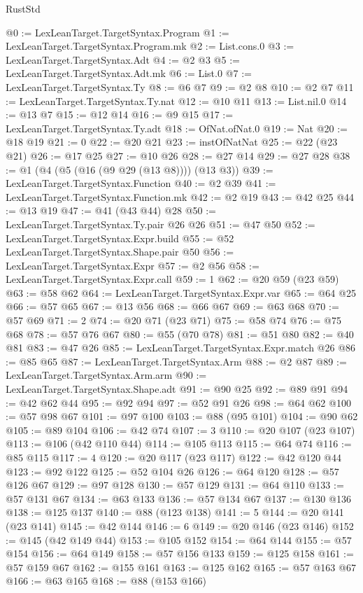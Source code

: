 \begin{lexlean}{RustStd}
\begin{coremodule}
@0 := LexLeanTarget.TargetSyntax.Program
@1 := LexLeanTarget.TargetSyntax.Program.mk
@2 := List.cons.{0}
@3 := LexLeanTarget.TargetSyntax.Adt
@4 := @2 @3
@5 := LexLeanTarget.TargetSyntax.Adt.mk
@6 := List.{0}
@7 := LexLeanTarget.TargetSyntax.Ty
@8 := @6 @7
@9 := @2 @8
@10 := @2 @7
@11 := LexLeanTarget.TargetSyntax.Ty.nat
@12 := @10 @11
@13 := List.nil.{0}
@14 := @13 @7
@15 := @12 @14
@16 := @9 @15
@17 := LexLeanTarget.TargetSyntax.Ty.adt
@18 := OfNat.ofNat.{0}
@19 := Nat
@20 := @18 @19
@21 := 0
@22 := @20 @21
@23 := instOfNatNat
@25 := @22 (@23 @21)
@26 := @17 @25
@27 := @10 @26
@28 := @27 @14
@29 := @27 @28
@38 := @1 (@4 (@5 (@16 (@9 @29 (@13 @8)))) (@13 @3))
@39 := LexLeanTarget.TargetSyntax.Function
@40 := @2 @39
@41 := LexLeanTarget.TargetSyntax.Function.mk
@42 := @2 @19
@43 := @42 @25
@44 := @13 @19
@47 := @41 (@43 @44) @28
@50 := LexLeanTarget.TargetSyntax.Ty.pair @26 @26
@51 := @47 @50
@52 := LexLeanTarget.TargetSyntax.Expr.build
@55 := @52 LexLeanTarget.TargetSyntax.Shape.pair @50
@56 := LexLeanTarget.TargetSyntax.Expr
@57 := @2 @56
@58 := LexLeanTarget.TargetSyntax.Expr.call
@59 := 1
@62 := @20 @59 (@23 @59)
@63 := @58 @62
@64 := LexLeanTarget.TargetSyntax.Expr.var
@65 := @64 @25
@66 := @57 @65
@67 := @13 @56
@68 := @66 @67
@69 := @63 @68
@70 := @57 @69
@71 := 2
@74 := @20 @71 (@23 @71)
@75 := @58 @74
@76 := @75 @68
@78 := @57 @76 @67
@80 := @55 (@70 @78)
@81 := @51 @80
@82 := @40 @81
@83 := @47 @26
@85 := LexLeanTarget.TargetSyntax.Expr.match @26
@86 := @85 @65
@87 := LexLeanTarget.TargetSyntax.Arm
@88 := @2 @87
@89 := LexLeanTarget.TargetSyntax.Arm.arm
@90 := LexLeanTarget.TargetSyntax.Shape.adt
@91 := @90 @25
@92 := @89 @91
@94 := @42 @62 @44
@95 := @92 @94
@97 := @52 @91 @26
@98 := @64 @62
@100 := @57 @98 @67
@101 := @97 @100
@103 := @88 (@95 @101)
@104 := @90 @62
@105 := @89 @104
@106 := @42 @74
@107 := 3
@110 := @20 @107 (@23 @107)
@113 := @106 (@42 @110 @44)
@114 := @105 @113
@115 := @64 @74
@116 := @85 @115
@117 := 4
@120 := @20 @117 (@23 @117)
@122 := @42 @120 @44
@123 := @92 @122
@125 := @52 @104 @26
@126 := @64 @120
@128 := @57 @126 @67
@129 := @97 @128
@130 := @57 @129
@131 := @64 @110
@133 := @57 @131 @67
@134 := @63 @133
@136 := @57 @134 @67
@137 := @130 @136
@138 := @125 @137
@140 := @88 (@123 @138)
@141 := 5
@144 := @20 @141 (@23 @141)
@145 := @42 @144
@146 := 6
@149 := @20 @146 (@23 @146)
@152 := @145 (@42 @149 @44)
@153 := @105 @152
@154 := @64 @144
@155 := @57 @154
@156 := @64 @149
@158 := @57 @156 @133
@159 := @125 @158
@161 := @57 @159 @67
@162 := @155 @161
@163 := @125 @162
@165 := @57 @163 @67
@166 := @63 @165
@168 := @88 (@153 @166)

\end{coremodule}
\end{lexlean}
